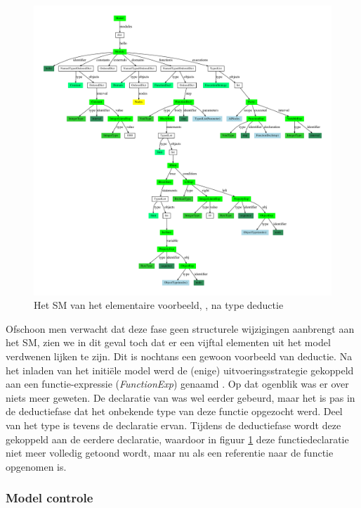 \begin{figure}[ht]
  \centering
  \includegraphics[width=\linewidth]{resources/hello_sm_inferred.pdf}
  \caption{Het SM van het elementaire voorbeeld, , na type deductie}
  \label{fig:hello.sm-inferred}
\end{figure}

Ofschoon men verwacht dat deze fase geen structurele wijzigingen aanbrengt aan
het SM, zien we in dit geval toch dat er een vijftal elementen uit het model
verdwenen lijken te zijn. Dit is nochtans een gewoon voorbeeld van deductie. Na
het inladen van het initi\"ele model werd de (enige) uitvoeringsstrategie
gekoppeld aan een functie-expressie (\emph{FunctionExp}) genaamd . Op
dat ogenblik was er over  niets meer geweten. De declaratie van
 was wel eerder gebeurd, maar het is pas in de deductiefase dat het
onbekende type van deze functie opgezocht werd. Deel van het type is tevens de
declaratie ervan. Tijdens de deductiefase wordt deze gekoppeld aan de eerdere
declaratie, waardoor in figuur \ref{fig:hello.sm-inferred} deze
functiedeclaratie niet meer volledig getoond wordt, maar nu als een referentie
naar de  functie opgenomen is.

\vspace{-3mm}

\subsubsection{Model controle}

